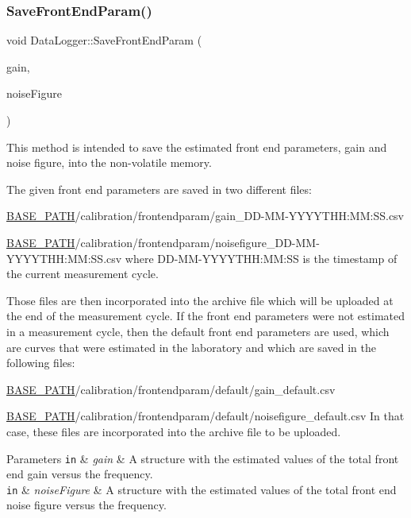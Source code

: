 \subsubsection{\texorpdfstring{Save\+Front\+End\+Param()}{SaveFrontEndParam()}}
{\footnotesize\ttfamily void Data\+Logger\+::\+Save\+Front\+End\+Param (\begin{DoxyParamCaption}\item[{const \hyperlink{structFreqValues}{Freq\+Values} \&}]{gain,  }\item[{const \hyperlink{structFreqValues}{Freq\+Values} \&}]{noise\+Figure }\end{DoxyParamCaption})}



This method is intended to save the estimated front end parameters, gain and noise figure, into the non-\/volatile memory. 

The given front end parameters are saved in two different files\+:
\begin{DoxyItemize}
\item \hyperlink{Basics_8h_a0423f4cb393331ce0b9f6b3a43adcaae}{B\+A\+S\+E\+\_\+\+P\+A\+TH}/calibration/frontendparam/gain\+\_\+\+D\+D-\/\+M\+M-\/\+Y\+Y\+Y\+Y\+T\+HH\+:MM\+:S\+S.\+csv
\item \hyperlink{Basics_8h_a0423f4cb393331ce0b9f6b3a43adcaae}{B\+A\+S\+E\+\_\+\+P\+A\+TH}/calibration/frontendparam/noisefigure\+\_\+\+D\+D-\/\+M\+M-\/\+Y\+Y\+Y\+Y\+T\+HH\+:MM\+:S\+S.\+csv where D\+D-\/\+M\+M-\/\+Y\+Y\+Y\+Y\+T\+HH\+:MM\+:SS is the timestamp of the current measurement cycle.
\end{DoxyItemize}

Those files are then incorporated into the archive file which will be uploaded at the end of the measurement cycle. If the front end parameters were not estimated in a measurement cycle, then the default front end parameters are used, which are curves that were estimated in the laboratory and which are saved in the following files\+:
\begin{DoxyItemize}
\item \hyperlink{Basics_8h_a0423f4cb393331ce0b9f6b3a43adcaae}{B\+A\+S\+E\+\_\+\+P\+A\+TH}/calibration/frontendparam/default/gain\+\_\+default.csv
\item \hyperlink{Basics_8h_a0423f4cb393331ce0b9f6b3a43adcaae}{B\+A\+S\+E\+\_\+\+P\+A\+TH}/calibration/frontendparam/default/noisefigure\+\_\+default.csv In that case, these files are incorporated into the archive file to be uploaded. 
\begin{DoxyParams}[1]{Parameters}
\mbox{\tt in}  & {\em gain} & A structure with the estimated values of the total front end gain versus the frequency. \\
\hline
\mbox{\tt in}  & {\em noise\+Figure} & A structure with the estimated values of the total front end noise figure versus the frequency. \\
\hline
\end{DoxyParams}

\end{DoxyItemize}\mbox{\label{classDataLogger_a0c772c3529adc3759ba0e1e596500f65}} 
